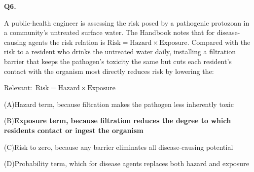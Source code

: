 \documentclass[11pt]{article}
\newcommand{\correct}[1]{\textbf{#1}\;{\color{accent}$\checkmark$}}
\newcommand{\optline}[2]{\par\noindent\hspace{1.2em}(#1)\hspace{0.6em}#2}
\begin{document}
\vspace{9pt}
\filbreak
\textbf{\color{accent}Q6.}\quad {\small\color{soft}[D15-Q06 \textbullet\ MCQ \textbullet\ Risk for disease-causing agents (Risk = Hazard $\times$ Exposure)]}\par\vspace{2pt}
A public-health engineer is assessing the risk posed by a pathogenic protozoan in a community's untreated surface water. The Handbook notes that for disease-causing agents the risk relation is $\text{Risk} = \text{Hazard} \times \text{Exposure}$. Compared with the risk to a resident who drinks the untreated water daily, installing a filtration barrier that keeps the pathogen's toxicity the same but cuts each resident's contact with the organism most directly reduces risk by lowering the:\par\par\vspace{3pt}
{\small\color{soft}Relevant:}\ $\text{Risk} = \text{Hazard} \times \text{Exposure}$\par\vspace{3pt}
\optline{A}{Hazard term, because filtration makes the pathogen less inherently toxic}
\optline{B}{\correct{Exposure term, because filtration reduces the degree to which residents contact or ingest the organism}}
\optline{C}{Risk to zero, because any barrier eliminates all disease-causing potential}
\optline{D}{Probability term, which for disease agents replaces both hazard and exposure}
\par\vspace{3pt}
\end{document}
